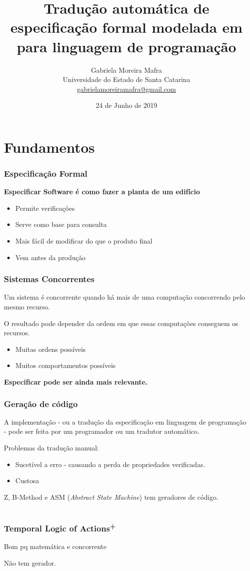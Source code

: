 \documentclass{beamer}
\title[De \TLA para linguagem de programação]{Tradução automática de especificação formal modelada em \TLA para linguagem de programação}
\author[Gabriela M. Mafra]{
    Gabriela Moreira Mafra\\\smallskip
    {\scriptsize Universidade do Estado de Santa Catarina \\\smallskip
    \vspace{-2mm}
    \url{gabrielamoreiramafra@gmail.com}}
}
\begin{document}
  \date{24 de Junho de 2019}
  \begin{frame}
      \titlepage
  \end{frame}

\tableofcontents

\section{Fundamentos}

\begin{frame}
  \frametitle{Especificação Formal}

  \textbf{Especificar Software é como fazer a planta de um edifício}
  \begin{itemize}
    \item Permite verificações
    \item Serve como base para consulta
    \item Mais fácil de modificar do que o produto final
    \item Vem antes da produção
  \end{itemize}

\end{frame}

\begin{frame}
  \frametitle{Sistemas Concorrentes}

  Um sistema é concorrente quando há mais de uma computação concorrendo pelo mesmo recurso.\medskip

  O resultado pode depender da ordem em que essas computações conseguem os recursos.
  \begin{itemize}
    \item Muitas ordens possíveis
    \item Muitos comportamentos possíveis
  \end{itemize}

  \medskip\textbf{Especificar pode ser ainda mais relevante.}

\end{frame}

\begin{frame}
  \frametitle{Geração de código}

  A implementação - ou a tradução da especificação em linguagem de programação - pode ser feita por um programador ou um tradutor automático.\medskip

  Problemas da tradução manual:
  \begin{itemize}
    \item Sucetível a erro - causando a perda de propriedades verificadas.
    \item Custosa
  \end{itemize}\medskip

  Z, B-Method e ASM (\textit{Abstract State Machine}) tem geradores de código.\medskip

\end{frame}

\section{\TLA}

\begin{frame}
  \frametitle{Temporal Logic of Actions\textsuperscript{+}}

  Bom pq matemática e concorrente

  Não tem gerador.

\end{frame}
\end{document}

